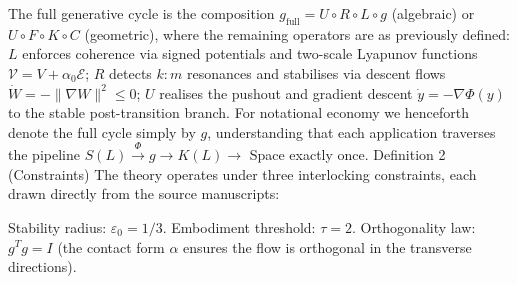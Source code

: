 The full generative cycle is the composition
$   g_{\text{full}} = U \circ R \circ L \circ g   $
(algebraic) or $  U \circ F \circ K \circ C  $ (geometric), where the remaining operators are as previously defined: $  L  $ enforces coherence via signed potentials and two-scale Lyapunov functions $  \mathcal{V} = V + \alpha_0 \mathcal{E}  $; $  R  $ detects $  k:m  $ resonances and stabilises via descent flows $  \dot{W} = -\|\nabla W\|^2 \le 0  $; $  U  $ realises the pushout and gradient descent $  \dot{y} = -\nabla \Phi(y)  $ to the stable post-transition branch. For notational economy we henceforth denote the full cycle simply by $  g  $, understanding that each application traverses the pipeline $  S(L) \xrightarrow{\Phi} g \to K(L) \to  $ Space exactly once.
Definition 2 (Constraints)
The theory operates under three interlocking constraints, each drawn directly from the source manuscripts:

Stability radius: $  \varepsilon_0 = 1/3  $.
Embodiment threshold: $  \tau = 2  $.
Orthogonality law: $  g^T g = I  $ (the contact form $  \alpha  $ ensures the flow is orthogonal in the transverse directions).

